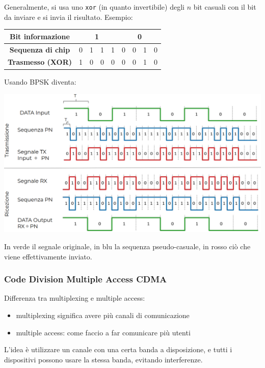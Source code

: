 Generalmente, si usa uno \texttt{xor} (in quanto invertibile) degli $n$ bit casuali con il bit da inviare e si invia il risultato. Esempio: 
\begin{center}
	\begin{tabular}{|c|c|c|c|c|c|c|c|c|}
		\hline
		\multicolumn{1}{|c|}{\textbf{Bit informazione}} & \multicolumn{4}{c|}{\textbf{1}} & \multicolumn{4}{c|}{\textbf{0}} \\ 
		\hline
		\textbf{Sequenza di chip} & 0 & 1 & 1 & 1 & 0 & 0 & 1 & 0 \\ 
		\hline
		\textbf{Trasmesso (XOR)} & 1 & 0 & 0 & 0 & 0 & 0 & 1 & 0\\ 
		\hline
	\end{tabular}
\end{center}
Usando BPSK diventa: 
\begin{center}
	\includegraphics[width=0.95\linewidth]{img/wireless/DSSS1}
\end{center}
In verde il {\color{green} segnale originale}, in blu la {\color{blue} sequenza pseudo-casuale}, in rosso ciò che viene {\color{red} effettivamente inviato}.



\subsubsection{Code Division Multiple Access CDMA}
Differenza tra multiplexing e multiple access:
\begin{itemize}
	\item multiplexing significa avere più canali di comunicazione
	\item multiple access: come faccio a far comunicare più utenti 
\end{itemize}

L'idea è utilizzare un canale con una certa banda a disposizione, e tutti i dispositivi possono usare la stessa banda, evitando interferenze.

